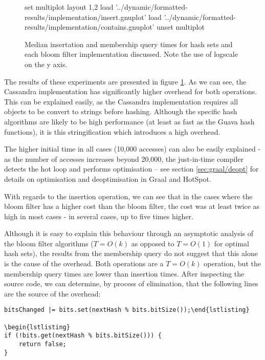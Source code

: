 \begin{figure}
	\centering
	\begin{gnuplot}[terminal=pdf]
	set multiplot layout 1,2
		load '../dynamic/formatted-results/implementation/insert.gnuplot'
		load '../dynamic/formatted-results/implementation/contains.gnuplot'
	unset multiplot
	\end{gnuplot}
	\caption{Median insertation and membership query times for hash sets and each bloom filter implementation discussed. Note the use of logscale on the y axis.}
	\label{chart:implementation-insert}
\end{figure}

The results of these experiments are presented in figure \ref{chart:implementation-insert}. As we can see, the Cassandra implementation has significantly higher overhead for both operations. This can be explained easily, as the Cassandra implementation requires all objects to be convert to strings before hashing. Although the specific hash algorithms are likely to be high performance (at least as fast as the Guava hash functions), it is this stringification which introduces a high overhead.

The higher initial time in all cases (10,000 accesses) can also be easily explained - as the number of accesses increases beyond 20,000, the just-in-time compiler detects the hot loop and performs optimisation -- see section \ref{sec:graal/deopt} for details on optimisation and deoptimisation in Graal and HotSpot.

With regards to the insertion operation, we can see that in the cases where the bloom filter has a higher cost than the bloom filter, the cost was at least twice as high in most cases - in several cases, up to five times higher.

Although it is easy to explain this behaviour through an asymptotic analysis of the bloom filter algorithms ($T=O(k)$ as opposed to $T=O(1)$ for optimal hash sets), the results from the membership query do not suggest that this alone is the cause of the overhead. Both operations are a $T=O(k)$ operation, but the membership query times are lower than insertion times. After inspecting the source code, we can determine, by process of elimination, that the following lines are the source of the overhead:

\begin{lstlisting}
bitsChanged |= bits.set(nextHash % bits.bitSize());\end{lstlisting}

\begin{lstlisting}
if (!bits.get(nextHash % bits.bitSize())) {
    return false;
}\end{lstlisting}

